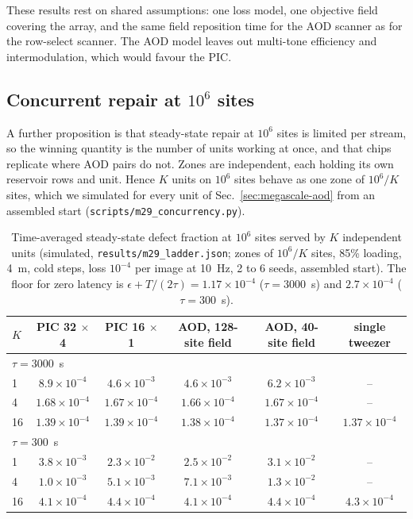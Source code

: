 These results rest on shared assumptions: one loss model, one objective field covering the array, and the same field reposition time for the AOD scanner as for the row-select scanner. The AOD model leaves out multi-tone efficiency and intermodulation, which would favour the PIC.

\subsection{Concurrent repair at \texorpdfstring{$10^6$}{10\textasciicircum 6} sites}\label{sec:megascale-concurrency}

A further proposition is that steady-state repair at $10^6$ sites is limited per stream, so the winning quantity is the number of units working at once, and that chips replicate where AOD pairs do not. Zones are independent, each holding its own reservoir rows and unit. Hence $K$ units on $10^6$ sites behave as one zone of $10^6/K$ sites, which we simulated for every unit of Sec.~\ref{sec:megascale-aod} from an assembled start (\texttt{scripts/\allowbreak m29\_concurrency.py}).

\begin{table}[htbp]\centering\small
\caption{Time-averaged steady-state defect fraction at $10^6$ sites served by $K$ independent units (simulated, \texttt{results/\allowbreak m29\_ladder.json}; zones of $10^6/K$ sites, 85\% loading, 4~\textmu m, cold steps, loss $10^{-4}$ per image at 10~Hz, 2 to 6 seeds, assembled start). The floor for zero latency is $\epsilon+T/(2\tau)=1.17\times10^{-4}$ ($\tau=3000$~s) and $2.7\times10^{-4}$ ($\tau=300$~s).}
\label{tab:megascale-conc}
\footnotesize\setlength{\tabcolsep}{4pt}
\begin{tabular}{lccccc}
\toprule
$K$ & PIC 32 $\times$ 4 & PIC 16 $\times$ 1 & AOD, 128-site field & AOD, 40-site field & single tweezer \\
\midrule
\multicolumn{6}{l}{$\tau=3000$~s} \\
1 & $8.9\times10^{-4}$ & $4.6\times10^{-3}$ & $4.6\times10^{-3}$ & $6.2\times10^{-3}$ & -- \\
4 & $1.68\times10^{-4}$ & $1.67\times10^{-4}$ & $1.66\times10^{-4}$ & $1.67\times10^{-4}$ & -- \\
16 & $1.39\times10^{-4}$ & $1.39\times10^{-4}$ & $1.38\times10^{-4}$ & $1.37\times10^{-4}$ & $1.37\times10^{-4}$ \\
\multicolumn{6}{l}{$\tau=300$~s} \\
1 & $3.8\times10^{-3}$ & $2.3\times10^{-2}$ & $2.5\times10^{-2}$ & $3.1\times10^{-2}$ & -- \\
4 & $1.0\times10^{-3}$ & $5.1\times10^{-3}$ & $7.1\times10^{-3}$ & $1.3\times10^{-2}$ & -- \\
16 & $4.1\times10^{-4}$ & $4.4\times10^{-4}$ & $4.1\times10^{-4}$ & $4.4\times10^{-4}$ & $4.3\times10^{-4}$ \\
\bottomrule
\end{tabular}
\end{table}

